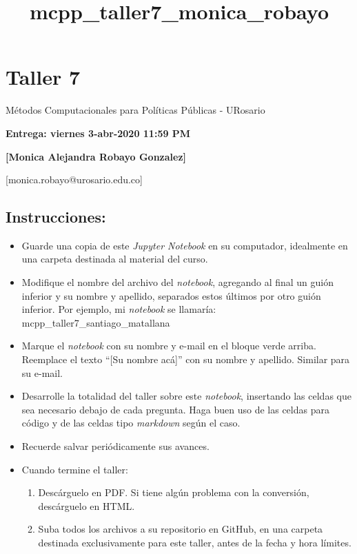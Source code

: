 \documentclass[11pt]{article}
\title{mcpp\_taller7\_monica\_robayo}
\providecommand{\tightlist}{%
      \setlength{\itemsep}{0pt}\setlength{\parskip}{0pt}}
\begin{document}
    
    \maketitle
    
    

    
    \hypertarget{taller-7}{%
\section{Taller 7}\label{taller-7}}

Métodos Computacionales para Políticas Públicas - URosario

\textbf{Entrega: viernes 3-abr-2020 11:59 PM}

    \textbf{{[}Monica Alejandra Robayo Gonzalez{]}}

{[}monica.robayo@urosario.edu.co{]}

    \hypertarget{instrucciones}{%
\subsection{Instrucciones:}\label{instrucciones}}

\begin{itemize}
\tightlist
\item
  Guarde una copia de este \emph{Jupyter Notebook} en su computador,
  idealmente en una carpeta destinada al material del curso.
\item
  Modifique el nombre del archivo del \emph{notebook}, agregando al
  final un guión inferior y su nombre y apellido, separados estos
  últimos por otro guión inferior. Por ejemplo, mi \emph{notebook} se
  llamaría: mcpp\_taller7\_santiago\_matallana
\item
  Marque el \emph{notebook} con su nombre y e-mail en el bloque verde
  arriba. Reemplace el texto ``{[}Su nombre acá{]}'' con su nombre y
  apellido. Similar para su e-mail.
\item
  Desarrolle la totalidad del taller sobre este \emph{notebook},
  insertando las celdas que sea necesario debajo de cada pregunta. Haga
  buen uso de las celdas para código y de las celdas tipo
  \emph{markdown} según el caso.
\item
  Recuerde salvar periódicamente sus avances.
\item
  Cuando termine el taller:

  \begin{enumerate}
  \def\labelenumi{\arabic{enumi}.}
  \tightlist
  \item
    Descárguelo en PDF. Si tiene algún problema con la conversión,
    descárguelo en HTML.
  \item
    Suba todos los archivos a su repositorio en GitHub, en una carpeta
    destinada exclusivamente para este taller, antes de la fecha y hora
    límites.
  \end{enumerate}
\end{itemize}
\end{document}
